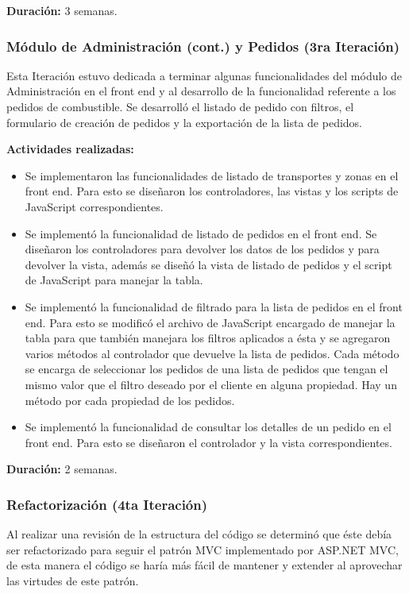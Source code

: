 \textbf{Duración:} 3 semanas.

\subsubsection{Módulo de Administración (cont.) y Pedidos (3ra Iteración)}
Esta Iteración estuvo dedicada a terminar algunas funcionalidades del módulo de Administración en el front end y al desarrollo de la funcionalidad referente a los pedidos de combustible. Se desarrolló el listado de pedido con filtros, el formulario de creación de pedidos y la exportación de la lista de pedidos.

\pagebreak
\textbf{Actividades realizadas:}
\begin{itemize}
    \item Se implementaron las funcionalidades de listado de transportes y zonas en el front end. Para esto se diseñaron los controladores, las vistas y los scripts de JavaScript correspondientes.
    \item Se implementó la funcionalidad de listado de pedidos en el front end. Se diseñaron los controladores para devolver los datos de los pedidos y para devolver la vista, además se diseñó la vista de listado de pedidos y el script de JavaScript para manejar la tabla.
    \item Se implementó la funcionalidad de filtrado para la lista de pedidos en el front end. Para esto se modificó el archivo de JavaScript encargado de manejar la tabla para que también manejara los filtros aplicados a ésta y se agregaron varios métodos al controlador que devuelve la lista de pedidos. Cada método se encarga de seleccionar los pedidos de una lista de pedidos que tengan el mismo valor que el filtro deseado por el cliente en alguna propiedad. Hay un método por cada propiedad de los pedidos.
    \item Se implementó la funcionalidad de consultar los detalles de un pedido en el front end. Para esto se diseñaron el controlador y la vista correspondientes.
\end{itemize}

\textbf{Duración:} 2 semanas.

\subsubsection{Refactorización (4ta Iteración)} \label{refactorizacion}
Al realizar una revisión de la estructura del código se determinó que éste debía ser refactorizado para seguir el patrón MVC implementado por ASP.NET MVC, de esta manera el código se haría más fácil de mantener y extender al aprovechar las virtudes de este patrón.

